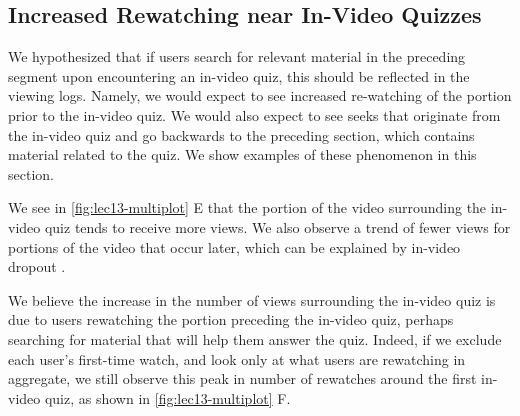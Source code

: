 \documentclass{sigchi}
\begin{document}

\subsection{Increased Rewatching near In-Video Quizzes}

We hypothesized that if users search for relevant material in the preceding segment upon encountering an in-video quiz, this should be reflected in the viewing logs. Namely, we would expect to see increased re-watching of the portion prior to the in-video quiz. We would also expect to see seeks that originate from the in-video quiz and go backwards to the preceding section, which contains material related to the quiz. We show examples of these phenomenon in this section.

We see in \autoref{fig:lec13-multiplot} E that the portion of the video surrounding the in-video quiz tends to receive more views. We also observe a trend of fewer views for portions of the video that occur later, which can be explained by in-video dropout \cite{juho}.


We believe the increase in the number of views surrounding the in-video quiz is due to users rewatching the portion preceding the in-video quiz, perhaps searching for material that will help them answer the quiz. Indeed, if we exclude each user's first-time watch, and look only at what users are rewatching in aggregate, we still observe this peak in number of rewatches around the first in-video quiz, as shown in \autoref{fig:lec13-multiplot} F. %
\end{document}
